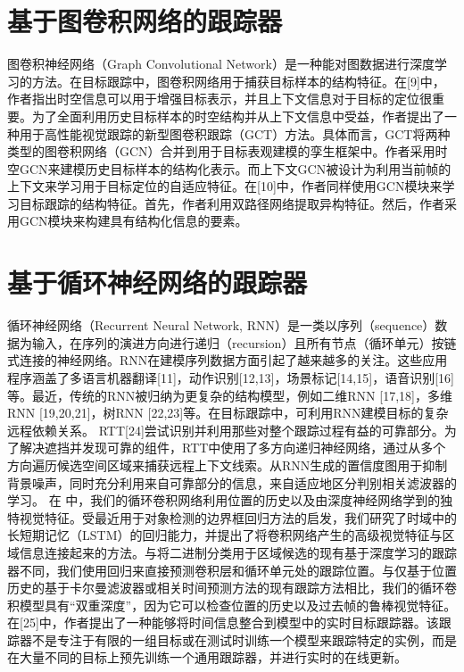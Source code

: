 \section{基于图卷积网络的跟踪器}
图卷积神经网络（Graph Convolutional Network）是一种能对图数据进行深度学习的方法。在目标跟踪中，图卷积网络用于捕获目标样本的结构特征。在[9]中，作者指出时空信息可以用于增强目标表示，并且上下文信息对于目标的定位很重要。为了全面利用历史目标样本的时空结构并从上下文信息中受益，作者提出了一种用于高性能视觉跟踪的新型图卷积跟踪（GCT）方法。具体而言，GCT将两种类型的图卷积网络（GCN）合并到用于目标表观建模的孪生框架中。作者采用时空GCN来建模历史目标样本的结构化表示。而上下文GCN被设计为利用当前帧的上下文来学习用于目标定位的自适应特征。在[10]中，作者同样使用GCN模块来学习目标跟踪的结构特征。首先，作者利用双路径网络提取异构特征。然后，作者采用GCN模块来构建具有结构化信息的要素。
\section{基于循环神经网络的跟踪器}
循环神经网络（Recurrent Neural Network, RNN）是一类以序列（sequence）数据为输入，在序列的演进方向进行递归（recursion）且所有节点（循环单元）按链式连接的神经网络。RNN在建模序列数据方面引起了越来越多的关注。这些应用程序涵盖了多语言机器翻译[11]，动作识别[12,13]，场景标记[14,15]，语音识别[16]等。最近，传统的RNN被归纳为更复杂的结构模型，例如二维RNN [17,18]，多维RNN [19,20,21]，树RNN [22,23]等。在目标跟踪中，可利用RNN建模目标的复杂远程依赖关系。
RTT[24]尝试识别并利用那些对整个跟踪过程有益的可靠部分。为了解决遮挡并发现可靠的组件，RTT中使用了多方向递归神经网络，通过从多个方向遍历候选空间区域来捕获远程上下文线索。从RNN生成的置信度图用于抑制背景噪声，同时充分利用来自可靠部分的信息，来自适应地区分判别相关滤波器的学习。%
在 \cite{SpatiallySupervised} 中，我们的循环卷积网络利用位置的历史以及由深度神经网络学到的独特视觉特征。受最近用于对象检测的边界框回归方法的启发，我们研究了时域中的长短期记忆（LSTM）的回归能力，并提出了将卷积网络产生的高级视觉特征与区域信息连接起来的方法。与将二进制分类用于区域候选的现有基于深度学习的跟踪器不同，我们使用回归来直接预测卷积层和循环单元处的跟踪位置。与仅基于位置历史的基于卡尔曼滤波器或相关时间预测方法的现有跟踪方法相比，我们的循环卷积模型具有“双重深度”，因为它可以检查位置的历史以及过去帧的鲁棒视觉特征。%
在[25]中，作者提出了一种能够将时间信息整合到模型中的实时目标跟踪器。该跟踪器不是专注于有限的一组目标或在测试时训练一个模型来跟踪特定的实例，而是在大量不同的目标上预先训练一个通用跟踪器，并进行实时的在线更新。%
